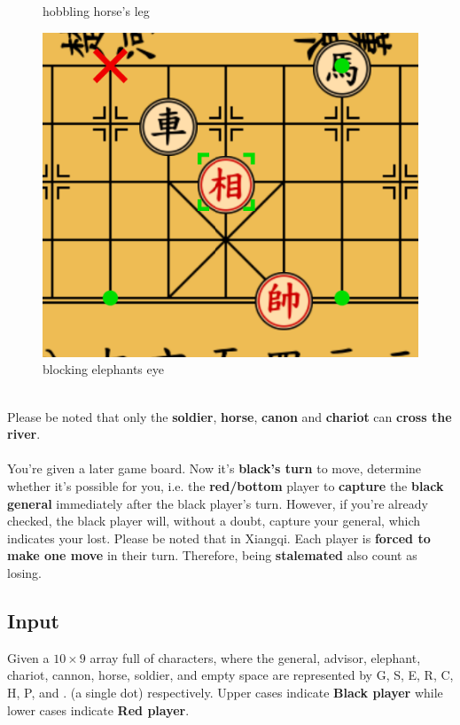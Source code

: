 \documentclass[12pt,a4paper]{article}
\begin{document}
\begin{figure}[htbp]
\begin{minipage}[b]{0.25\textwidth}
        \caption{hobbling horse's leg}
    \end{minipage}
    \begin{minipage}[b]{0.27\textwidth}
        \centering
        \includegraphics[width=\linewidth]{Xiangqi.assets/Elephant_movement.png}
        \caption{blocking elephant\textquotesingle s eye}
    \end{minipage}
\end{figure}
\\
\noindent
Please be noted that only the \textbf{soldier}, \textbf{horse}, \textbf{canon} and \textbf{chariot} can \textbf{cross the river}.
\\\\
\noindent
You're given a later game board. Now it's \textbf{black's turn} to move, determine whether it's possible for you, i.e. the \textbf{red/bottom} player to \textbf{capture} the \textbf{black general} immediately after the black player's turn. However, if you're already checked, the black player will, without a doubt, capture your general, which indicates your lost. Please be noted that in Xiangqi. Each player is \textbf{forced to make one move} in their turn. Therefore, being \textbf{stalemated} also count as losing.
\\
\subsection*{\fontsize{16}{12}Input}
Given a $10\times9$ array full of characters, where the general, advisor, elephant, chariot, cannon, horse, soldier, and empty space are represented by G, S, E, R, C, H, P, and . (a single dot) respectively. Upper cases indicate \textbf{Black player} while lower cases indicate \textbf{Red player}.
\end{document}
